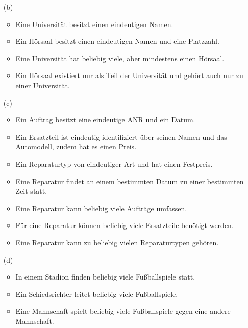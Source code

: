 \documentclass[a4paper,11pt,fleqn]{scrartcl}
\begin{document}
\begin{enumerate}
\begin{enumerate}
		\item[(b)]
			\begin{itemize}
				\item Eine Universität besitzt einen eindeutigen Namen.
				\item Ein Hörsaal besitzt einen eindeutigen Namen und eine Platzzahl.
				\item Eine Universität hat beliebig viele, aber mindestens einen Hörsaal.
				\item Ein Hörsaal existiert nur als Teil der Universität und gehört auch nur zu einer Universität.
			\end{itemize} \quad

		\item[(c)]
			\begin{itemize}
				\item Ein Auftrag besitzt eine eindeutige ANR und ein Datum.
				\item Ein Ersatzteil ist eindeutig identifiziert über seinen Namen und das Automodell, zudem hat es einen Preis.
				\item Ein Reparaturtyp von eindeutiger Art und hat einen Festpreis.
				\item Eine Reparatur findet an einem bestimmten Datum zu einer bestimmten Zeit statt.
				\item Eine Reparatur kann beliebig viele Aufträge umfassen.
				\item Für eine Reparatur können beliebig viele Ersatzteile benötigt werden.
				\item Eine Reparatur kann zu beliebig vielen Reparaturtypen gehören.
			\end{itemize} \quad

		\item[(d)]
			\begin{itemize}
				\item In einem Stadion finden beliebig viele Fußballspiele statt.
				\item Ein Schiedsrichter leitet beliebig viele Fußballspiele.
				\item Eine Mannschaft spielt beliebig viele Fußballspiele gegen eine andere Mannschaft.
			\end{itemize} \quad 
	\end{enumerate}


\end{enumerate}
\end{document}
